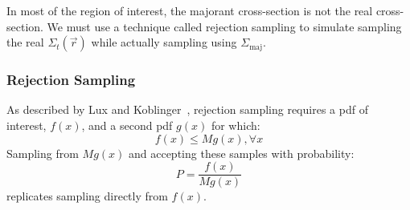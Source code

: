 In most of the region of interest, the majorant cross-section is not
the real cross-section. We must use a technique called rejection
sampling to simulate sampling the real $\Sigma_t(\vec{r})$ while
actually sampling using $\Sigma_\mathrm{maj}$. 

\subsubsection{Rejection Sampling}
\label{sec:rejection_sampling}
As described by Lux and
Koblinger~\cite{lux1991}, rejection sampling requires a \gls{pdf} of
interest, $f(x)$, and a second \gls{pdf} $g(x)$ for which:
\begin{equation}
  \label{eq:Mleq}
  f(x) \leq Mg(x), \forall x
\end{equation}
Sampling from $Mg(x)$ and accepting these samples with probability:
\begin{equation}
  \label{eq:preal}
  P = \frac{f(x)}{Mg(x)}
\end{equation}
replicates sampling directly from $f(x)$. 

